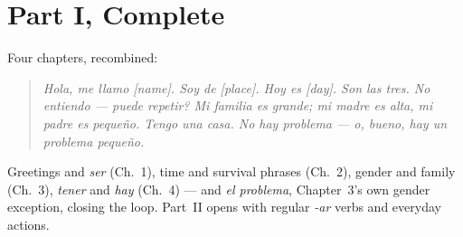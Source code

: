 \section{Part I, Complete}

Four chapters, recombined:

\begin{quote}
\itshape
Hola, me llamo [name]. Soy de [place]. Hoy es [day]. Son las tres. No
entiendo --- \textquestiondown puede repetir? Mi familia es grande; mi
madre es alta, mi padre es peque\~{n}o. Tengo una casa. No hay problema ---
o, bueno, hay un problema peque\~{n}o.
\end{quote}

Greetings and \emph{ser} (Ch.~1), time and survival phrases (Ch.~2),
gender and family (Ch.~3), \emph{tener} and \emph{hay} (Ch.~4) --- and
\emph{el problema}, Chapter~3's own gender exception, closing the loop.
Part~II opens with regular \emph{-ar} verbs and everyday actions.
